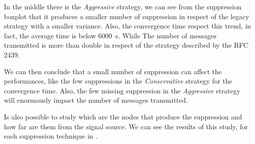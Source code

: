 In the middle there is the \textit{Aggressive} strategy, we can see from the
suppression boxplot that it produces a smaller number of suppression in respect
of the legacy strategy with a smaller variance.
Also, the convergence time respect this trend, in fact, the average time is
below \SI{6000}{\second}.
While The number of messages transmitted is more than double in respect
of the strategy described by the \ac{RFC} \num{2439}.

We can then conclude that a small number of suppression can affect the
performances, like the few suppressions in the \textit{Conservative} strategy
for the convergence time.
Also, the few missing suppression in the \textit{Aggressive} strategy will
enormously impact the number of messages transmitted.

Is also possible to study which are the nodes that produce the suppression and how
far are them from the signal source.
We can see the results of this study, for each suppression technique in .


